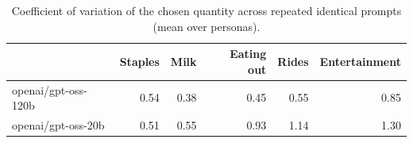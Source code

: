 \begin{table}[!htbp]\centering\small
\caption{Coefficient of variation of the chosen quantity across repeated identical prompts (mean over personas).}\label{tab:variability}
\begin{tabular}{lrrrrr}
\hline
 & Staples & Milk & Eating out & Rides & Entertainment \\ \hline
openai/gpt-oss-120b & 0.54 & 0.38 & 0.45 & 0.55 & 0.85 \\
openai/gpt-oss-20b & 0.51 & 0.55 & 0.93 & 1.14 & 1.30 \\
\hline
\end{tabular}
\end{table}